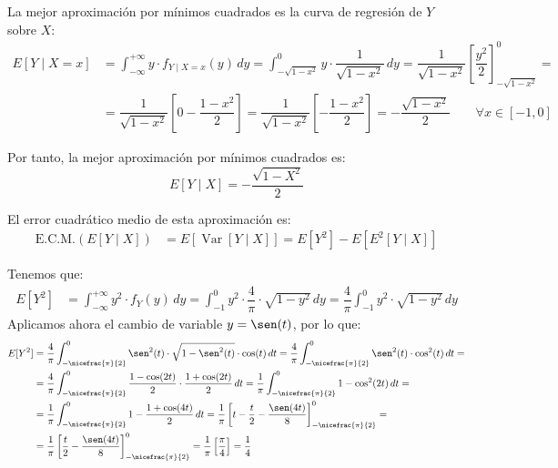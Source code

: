 \documentclass[12pt]{article}
\DeclareMathOperator{\Var}{Var}
\begin{document}
\begin{ejercicio}[5 puntos]
\begin{enumerate}
    La mejor aproximación por mínimos cuadrados es la curva de regresión de $Y$ sobre $X$:
    \begin{align*}
        E[Y\mid X=x] &= \int_{-\infty}^{+\infty} y\cdot f_{Y\mid X=x}(y) \, dy
        = \int_{-\sqrt{1-x^2}}^0 y\cdot \dfrac{1}{\sqrt{1-x^2}} \, dy
        = \dfrac{1}{\sqrt{1-x^2}} \left[\dfrac{y^2}{2}\right]_{-\sqrt{1-x^2}}^0
        =\\&= \dfrac{1}{\sqrt{1-x^2}} \left[0-\dfrac{1-x^2}{2}\right]
        = \dfrac{1}{\sqrt{1-x^2}} \left[-\dfrac{1-x^2}{2}\right]
        = -\dfrac{\sqrt{1-x^2}}{2}
        \qquad \forall x\in \left[-1,0\right]
    \end{align*}

    Por tanto, la mejor aproximación por mínimos cuadrados es:
    \begin{equation*}
        E[Y\mid X] = -\dfrac{\sqrt{1-X^2}}{2}
    \end{equation*}

    El error cuadrático medio de esta aproximación es:
    \begin{align*}
        \text{E.C.M.}(E[Y\mid X]) &= E[\Var[Y\mid X]] = E[Y^2] - E\left[E^2[Y\mid X]\right]
    \end{align*}

    Tenemos que:
    \begin{align*}
        E[Y^2] &= \int_{-\infty}^{+\infty} y^2\cdot f_Y(y) \, dy
        = \int_{-1}^0 y^2\cdot \dfrac{4}{\pi} \cdot \sqrt{1-y^2} \, dy
        = \dfrac{4}{\pi} \int_{-1}^0 y^2\cdot \sqrt{1-y^2} \, dy
    \end{align*}
    Aplicamos ahora el cambio de variable $y=\sen(t)$, por lo que:
    \begin{align*}
        E[Y^2] &= \dfrac{4}{\pi} \int_{-\nicefrac{\pi}{2}}^0 \sen^2(t)\cdot \sqrt{1-\sen^2(t)}\cdot \cos(t) \, dt
        = \dfrac{4}{\pi} \int_{-\nicefrac{\pi}{2}}^0 \sen^2(t)\cdot \cos^2(t) \, dt
        =\\&= \dfrac{4}{\pi} \int_{-\nicefrac{\pi}{2}}^0 \dfrac{1-\cos(2t)}{2}\cdot \dfrac{1+\cos(2t)}{2} \, dt
        = \dfrac{1}{\pi} \int_{-\nicefrac{\pi}{2}}^0 1-\cos^2(2t) \, dt
        =\\&= \dfrac{1}{\pi} \int_{-\nicefrac{\pi}{2}}^0 1-\dfrac{1+\cos(4t)}{2} \, dt
        = \dfrac{1}{\pi} \left[t-\dfrac{t}{2}-\dfrac{\sen(4t)}{8}\right]_{-\nicefrac{\pi}{2}}^0
        =\\&= \dfrac{1}{\pi} \left[\dfrac{t}{2}-\dfrac{\sen(4t)}{8}\right]_{-\nicefrac{\pi}{2}}^0 = \dfrac{1}{\pi} \left[\dfrac{\pi}{4}\right] = \dfrac{1}{4}
    \end{align*}


\end{enumerate}
\end{ejercicio}
\end{document}
